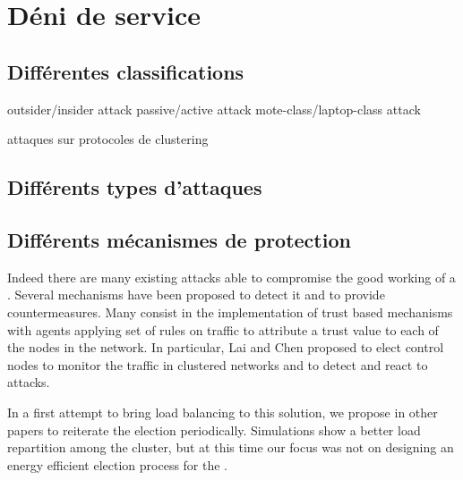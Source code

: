 \section{Déni de service}\label{ea:sec:dos}

\subsection{Différentes classifications}

outsider/insider attack
passive/active attack
mote-class/laptop-class attack

attaques sur protocoles de clustering

\subsection{Différents types d'attaques}

\subsection{Différents mécanismes de protection}

Indeed there are many existing attacks able to compromise the good working of a \wsn.%
Several mechanisms have been proposed to detect it and to provide countermeasures\cite{SSS11}. %
Many consist in the implementation of trust based mechanisms\cite{MC10,F-GRL07} with agents applying set of rules\cite{RKKK13} on traffic to attribute a trust value to each of the nodes in the network.
In particular, Lai and Chen\cite{LC08} proposed to elect control nodes to monitor the traffic in clustered networks and to detect and react to \dos attacks.



In a first attempt to bring load balancing to this solution, we propose in other papers\cite{GMT12,BMM13} to reiterate the election periodically.
Simulations show a better load repartition among the cluster, but at this time our focus was not on designing an energy efficient election process for the \cns.


